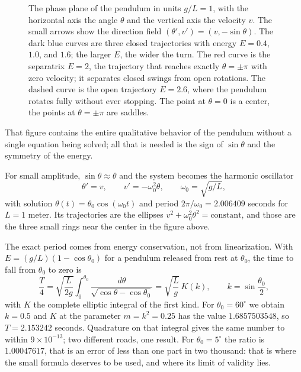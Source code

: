 \begin{figure}[htbp]
\caption{The phase plane of the pendulum in units $g/L=1$, with the horizontal axis the angle
$\theta$ and the vertical axis the velocity $v$. The small arrows show the direction field
$(\theta',v')=(v,-\sin\theta)$. The dark blue curves are three closed trajectories with
energy $E=0.4$, $1.0$, and $1.6$; the larger $E$, the wider the turn. The red curve is
the separatrix $E=2$, the trajectory that reaches exactly $\theta=\pm\pi$ with zero velocity;
it separates closed swings from open rotations. The dashed curve is the open trajectory
$E=2.6$, where the pendulum rotates fully without ever stopping. The point at $\theta=0$ is
a center, the points at $\theta=\pm\pi$ are saddles.}
\label{fig:bidang-fase-pendulum}
\end{figure}

That figure contains the entire qualitative behavior of the pendulum without a single
equation being solved; all that is needed is the sign of $\sin\theta$ and the symmetry of the
energy.

For small amplitude, $\sin\theta\approx\theta$ and the system becomes the harmonic
oscillator
\[
\theta'=v,\qquad v'=-\omega_{0}^{2}\theta,\qquad \omega_{0}=\sqrt{g/L},
\]
with solution $\theta(t)=\theta_{0}\cos(\omega_{0}t)$ and period
$2\pi/\omega_{0}=2.006409$ seconds for $L=1$ meter. Its trajectories are the ellipses
$v^{2}+\omega_{0}^{2}\theta^{2}=\text{constant}$, and those are the three small rings near
the center in the figure above.

The exact period comes from energy conservation, not from linearization.
With $E=(g/L)(1-\cos\theta_{0})$ for a pendulum released from rest at
$\theta_{0}$, the time to fall from $\theta_{0}$ to zero is
\[
\frac{T}{4}=\sqrt{\frac{L}{2g}}\int_{0}^{\theta_{0}}
\frac{d\theta}{\sqrt{\cos\theta-\cos\theta_{0}}}
=\sqrt{\frac{L}{g}}\,K(k),\qquad k=\sin\frac{\theta_{0}}{2},
\]
with $K$ the complete elliptic integral of the first kind. For $\theta_{0}=60^{\circ}$
we obtain $k=0.5$ and $K$ at the parameter $m=k^{2}=0.25$ has the value
$1.6857503548$, so $T=2.153242$ seconds. Quadrature on that integral gives the same
number to within $9\times10^{-13}$; two different roads, one result. For $\theta_{0}=5^{\circ}$
the ratio is $1.00047617$, that is an error of less than one part in two thousand: that is
where the small formula deserves to be used, and where its limit of validity lies.

